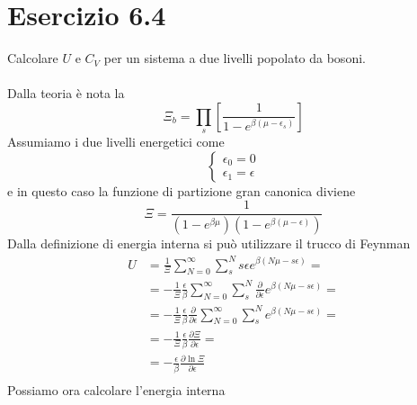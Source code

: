 \documentclass[a4paper]{article}
\begin{document}
    \section*{Esercizio 6.4}
        Calcolare $U$ e $C_V$ per un sistema a due livelli popolato da bosoni.
        \\
        \\
        Dalla teoria è nota la
        \begin{equation*}
            \Xi_b=\prod_s\left[\frac{1}{1-e^{\beta(\mu-\epsilon_s)}}\right]
        \end{equation*}
        Assumiamo i due livelli energetici come
        \begin{equation*}
            \begin{cases}
                \epsilon_0=0\\
                \epsilon_1=\epsilon
            \end{cases}
        \end{equation*}
        e in questo caso la funzione di partizione gran canonica diviene
        \begin{equation*}
            \Xi=\frac{1}{(1-e^{\beta\mu})(1-e^{\beta(\mu-\epsilon)})}
        \end{equation*}
        Dalla definizione di energia interna si può utilizzare il trucco di Feynman
        \begin{equation*}
            \begin{split}
                U&=\frac{1}{\Xi}\sum_{N=0}^\infty\sum_{s}^Ns\epsilon e^{\beta(N\mu-s\epsilon)}=\\
                &=-\frac{1}{\Xi}\frac{\epsilon}{\beta}\sum_{N=0}^\infty\sum_{s}^N\frac{\partial}{\partial\epsilon}e^{\beta(N\mu-s\epsilon)}=\\
                &=-\frac{1}{\Xi}\frac{\epsilon}{\beta}\frac{\partial}{\partial\epsilon}\sum_{N=0}^\infty\sum_{s}^Ne^{\beta(N\mu-s\epsilon)}=\\
                &=-\frac{1}{\Xi}\frac{\epsilon}{\beta}\frac{\partial\Xi}{\partial\epsilon}=\\
                &=-\frac{\epsilon}{\beta}\frac{\partial\ln\Xi}{\partial\epsilon}\\
            \end{split}
        \end{equation*}
        Possiamo ora calcolare l'energia interna
\end{document}
